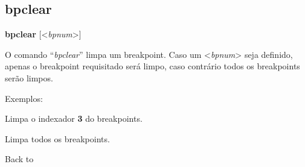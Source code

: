 \documentclass[letterpaper,10pt,brazil]{sphinxmanual}
\begin{document}
\subsection{bpclear}
\label{debugger/breakpoint:debugger-command-bpclear}\label{debugger/breakpoint:bpclear}
\begin{DUlineblock}{0em}
\item[]
\begin{DUlineblock}{\DUlineblockindent}
\item[] \textbf{bpclear} {[}\textless{}\emph{bpnum}\textgreater{}{]}
\item[] 
\end{DUlineblock}
\item[] O comando ``\emph{bpclear}'' limpa um breakpoint. Caso um \textless{}\emph{bpnum}\textgreater{} seja definido, apenas o breakpoint requisitado será limpo, caso contrário todos os breakpoints serão limpos.
\item[] 
\item[] Exemplos:
\item[] 
\item[]
\begin{DUlineblock}{\DUlineblockindent}
\item[] 
\item[] 
\end{DUlineblock}
\item[] Limpa o indexador \textbf{3} do breakpoints.
\item[] 
\item[]
\begin{DUlineblock}{\DUlineblockindent}
\item[] 
\item[] 
\end{DUlineblock}
\item[] Limpa todos os breakpoints.
\item[] 
\item[] Back to {\hyperref[debugger/breakpoint:debugger\string-breakpoint\string-list]{}}
\end{DUlineblock}
\begin{quote}
\label{debugger/breakpoint:debugger-command-bpdisable}\end{quote}
\end{document}
